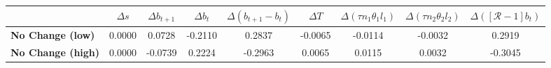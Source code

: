 \begin{tiny}\begin{tabular}{|l|c|c|c|c|c|c|c|c|}
\hline
&\textbf{$\Delta s$}&\textbf{$\Delta b_{t+1}$}&\textbf{$\Delta b_{t}$}&\textbf{$\Delta (b_{t+1}-b_t)$}&\textbf{$\Delta T$}&\textbf{$\Delta (\tau n_1\theta_1 l_1 )$}&\textbf{$\Delta (\tau n_2\theta_2 l_2)$}&\textbf{$\Delta ([\mathcal{R}-1]b_t)$}\\\hline
\textbf{No Change (low)}&0.0000&0.0728&-0.2110&0.2837&-0.0065&-0.0114&-0.0032&0.2919\\\hline
\textbf{No Change (high)}&0.0000&-0.0739&0.2224&-0.2963&0.0065&0.0115&0.0032&-0.3045\\\hline
\end{tabular}
\end{tiny}